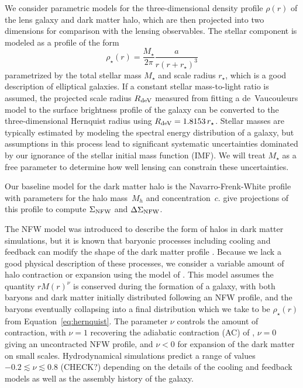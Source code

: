 \documentclass[12pt]{emulateapj}
\begin{document}
We consider parametric models for the three-dimensional density
profile $\rho(r)$ of the lens galaxy and dark matter halo, which are
then projected into two dimensions for comparison with the lensing
observables. The stellar component is modeled as a
\citet{Hernquist1990} profile of the form
\begin{equation}
\rho_{\star}(r) = \frac{M_{\star}}{2\pi} \frac{a}{r(r+r_{\star})^3}
\label{eq:hernquist}
\end{equation}
parametrized by the total stellar mass $M_{\star}$ and scale radius
$r_{\star}$, which is a good description of elliptical galaxies. If a
constant stellar mass-to-light ratio is assumed, the 
projected scale radius $R_{\rm deV}$ measured from fitting a
de~Vaucouleurs model to the surface brightness profile of the galaxy
can be converted to the three-dimensional Hernquist radius using $R_{\rm
  deV}=1.8153\,r_{\star}$. Stellar masses are typically
estimated by modeling the spectral energy distribution of a galaxy,
but assumptions in this process lead to significant systematic
uncertainties dominated by our ignorance of the stellar initial mass
function (IMF). We will treat $M_{\star}$ as a free parameter to
determine how well lensing can constrain these uncertainties.

Our baseline model for the dark matter halo is the Navarro-Frenk-White
\citep[NFW, ][]{Navarro1996} profile with parameters for the halo
mass~$M_{h}$ and concentration~$c$. \citet{Wright2000} give
projections of this profile to compute $\Sigma_{\rm NFW}$ and
$\Delta\Sigma_{\rm NFW}$.

The NFW model was introduced to describe the form of halos in dark
matter simulations, but it is known that baryonic processes
including cooling and feedback can modify the shape of the dark matter
profile \citep[e.g.,][]{Blumenthal1986, Gao2004, Gnedin2004,
  Johansson2009, Abadi2010, Gnedin2011}. Because we lack a good
physical description of these processes, we consider a variable amount
of halo contraction or expansion using the model of
\citet{Dutton2007}. This model assumes the quantity $rM(r)^\nu$ is
conserved during the formation of a galaxy, with both baryons and dark
matter initially distributed following an NFW profile, and the baryons
eventually collapsing into a final distribution which we take to be
$\rho_{\star}(r)$ from Equation~\ref{eq:hernquist}. The parameter
$\nu$ controls the amount of contraction, with $\nu=1$ recovering the
adiabatic contraction (AC) of \citet{Blumenthal1986}, $\nu=0$ giving an
uncontracted NFW profile, and $\nu<0$ for expansion of the dark matter
on small scales. Hydrodynamical simulations predict a range of values
$-0.2\lesssim \nu \lesssim 0.8$ (CHECK?) depending on the details of
the cooling and feedback models as well as the assembly history of the
galaxy.
\end{document}
